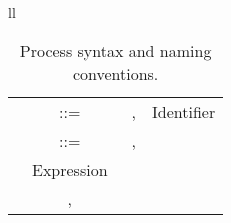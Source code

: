 \documentclass[a4paper]{article}
\begin{document}
\begin{table}[tb]
\begin{tabular}{ll}
\begin{tabular}{rclr}
\uu & ::= & \x \ \sep \Ia & {Identifier}\\
\e   & ::= & \va \ \sep \x  \\
&{Expression}\\
&\sep&
  \end{tabular}
\end{tabular}
 \vspace{1mm}
\caption{Process syntax and naming conventions.}
\end{table}
\end{document}

